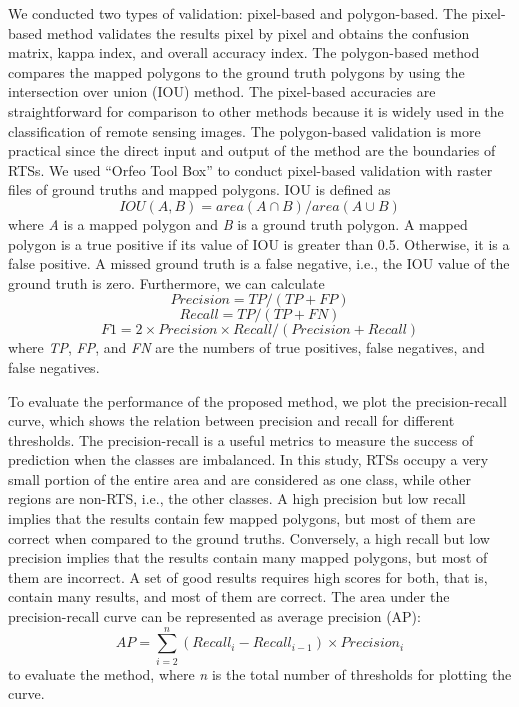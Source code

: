 \documentclass[preprint,12pt,authoryear]{elsarticle}
\begin{document}
We conducted two types of validation: pixel-based and polygon-based. The pixel-based method validates the results pixel by pixel and obtains the confusion matrix, kappa index, and overall accuracy index. The polygon-based method compares the mapped polygons to the ground truth polygons by using the intersection over union (IOU) method. The pixel-based accuracies are straightforward for comparison to other methods because it is widely used in the classification of remote sensing images. The polygon-based validation is more practical since the direct input and output of the method are the boundaries of RTSs. We used “Orfeo Tool Box” \citep{inglada2009orfeo} to conduct pixel-based validation with raster files of ground truths and mapped polygons. IOU is defined as 
\begin{equation}
IOU(A,B)=area(A \cap B)/area(A \cup B)
\label{equ_iou}
\end{equation}
where \emph{A} is a mapped polygon and \emph{B} is a ground truth polygon. A mapped polygon is a true positive if its value of IOU is greater than 0.5. Otherwise, it is a false positive. A missed ground truth is a false negative, i.e., the IOU value of the ground truth is zero. Furthermore, we can calculate
\begin{equation}
Precision=TP/(TP+FP)
\label{equ_precision}
\end{equation}
\begin{equation}
Recall=TP/(TP+FN)
\label{equ_recall}
\end{equation}
\begin{equation}
F1=2 \times Precision \times Recall / (Precision + Recall)
\label{equ_f1score}
\end{equation}
where \emph{TP}, \emph{FP}, and \emph{FN} are the numbers of true positives, false negatives, and false negatives. 

To evaluate the performance of the proposed method, we plot the precision-recall curve, which shows the relation between precision and recall for different thresholds. The precision-recall is a useful metrics to measure the success of prediction when the classes are imbalanced. In this study, RTSs occupy a very small portion of the entire area and are considered as one class, while other regions are non-RTS, i.e., the other classes. A high precision but low recall implies that the results contain few mapped polygons, but most of them are correct when compared to the ground truths. Conversely, a high recall but low precision implies that the results contain many mapped polygons, but most of them are incorrect. A set of good results requires high scores for both, that is, contain many results, and most of them are correct. The area under the precision-recall curve can be represented as average precision (AP):
\begin{equation}
AP=\sum_{i=2}^{n} (Recall_i - Recall_{i-1})\times Precision_i 
\label{equ_ap}
\end{equation}
to evaluate the method, where \emph{n} is the total number of thresholds for plotting the curve. 
\end{document}
